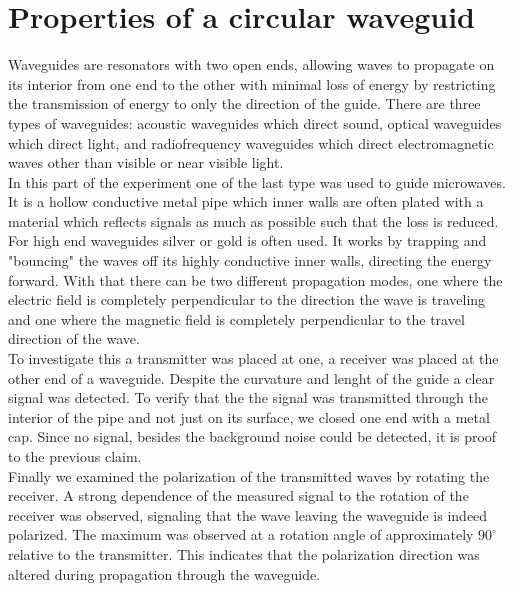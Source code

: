 \section{Properties of a circular waveguid} \label{sec:wellenleiter}

Waveguides are resonators with two open ends, allowing waves to propagate on its interior from one end to the other with minimal loss of energy by 
restricting the transmission of energy to only the direction of the guide. There are three types of waveguides: acoustic waveguides which direct
sound, optical waveguides which direct light, and radiofrequency waveguides which direct electromagnetic waves other than visible or near visible light. \\
In this part of the experiment one of the last type was used to guide microwaves. It is a hollow conductive metal pipe which inner walls are often plated
with a material which reflects signals as much as possible such that the loss is reduced. For high end waveguides silver or gold is often used.
It works by trapping and "bouncing" the waves off its highly conductive inner walls, directing the energy forward. With that there can be two
different propagation modes, one where the electric field is completely perpendicular to the direction the wave is traveling and one where the
magnetic field is completely perpendicular to the travel direction of the wave.\\
To investigate this a transmitter was placed at one, a receiver was placed at the other end of a waveguide. Despite the curvature and lenght of the guide
a clear signal was detected. To verify that the the signal was transmitted through the interior of the pipe and not just on its surface, we closed one
end with a metal cap. Since no signal, besides the background noise could be detected, it is proof to the previous claim.\\
Finally we examined the polarization of the transmitted waves by rotating the receiver. A strong dependence of the measured signal to the rotation
of the receiver was observed, signaling that the wave leaving the waveguide is indeed polarized. The maximum was observed at a rotation angle of
approximately $90^\circ$ relative to the transmitter. This indicates that the polarization direction was altered during propagation through the waveguide.